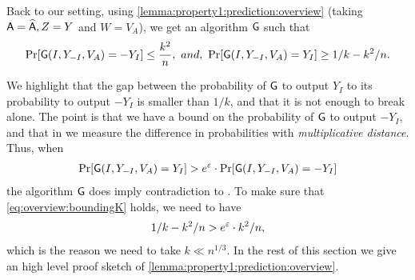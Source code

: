 Back to our setting, using  \cref{lemma:property1:prediction:overview} (taking $\mathsf{A}= \widehat{\mathsf{A}}, Z=Y$ and $W=V_A$), we get an algorithm $\mathsf{G}$ such that 
$$\pr{\Gc(I,Y_{-I}, V_A) = -Y_I} \leq \frac{k^2}{n},\ and,\
		\pr{\Gc(I,Y_{-I}, V_A) = Y_I} \geq 1/k - k^2/n.$$

We highlight that the gap between the probability of $\mathsf{G}$ to output $Y_I$ to its probability to output $-Y_I$ is smaller than $1/k$, and that it is not enough to break \DP alone. The point is that we  have a bound on the probability of $\mathsf{G}$ to output $-Y_I$, and that in \DP we measure the difference in probabilities with \emph{multiplicative distance}. Thus, when 
\begin{align}\label{eq:overview:boundingK}
\pr{\Gc(I,Y_{-I}, V_A) = Y_I} > e^\eps\cdot \pr{\Gc(I,Y_{-I}, V_A) = -Y_I} 
\end{align}
the algorithm $\mathsf{G}$ does imply contradiction to \DP. To make sure that \cref{eq:overview:boundingK} holds, we need to have
\begin{align*}
 1/k - k^2/n > e^\varepsilon\cdot k^2/n,
 \end{align*}
which is the reason we need to  take $k \ll n^{1/3}$.
In the rest of this section we give an high level proof sketch of \cref{lemma:property1:prediction:overview}.





